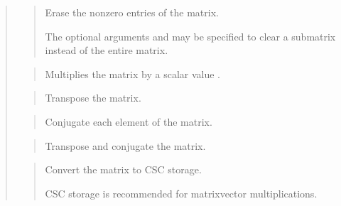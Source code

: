 \documentclass[a4paper,11pt,english]{sphinxmanual}
\begin{document}
\begin{quote}

\begin{quote}

Erase the non\sphinxhyphen{}zero entries of the matrix.

The optional arguments  and  may be specified to clear a
sub\sphinxhyphen{}matrix instead of the entire matrix.
\end{quote}

\begin{quote}

Multiplies the matrix by a scalar value .
\end{quote}

\begin{quote}

Transpose the matrix.
\end{quote}

\begin{quote}

Conjugate each element of the matrix.
\end{quote}

\begin{quote}

Transpose and conjugate the matrix.
\end{quote}

\begin{quote}

Convert the matrix to CSC storage.

CSC storage is recommended for matrix\sphinxhyphen{}vector multiplications.
\end{quote}

\begin{quote}


\end{quote}
\end{quote}
\end{document}
